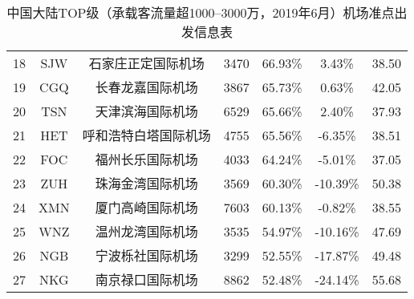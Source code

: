 \begin{table}
{\begin{tabular}{ccccccc}
            18 & SJW & 石家庄正定国际机场 & 3470 & 66.93\% & 3.43\% & 38.50 \\
            \rowcolor[HTML]{EFEFEF}
            19 & CGQ & 长春龙嘉国际机场 & 3867 & 65.73\% & 0.63\% & 42.05 \\
            20 & TSN & 天津滨海国际机场 & 6529 & 65.66\% & 2.40\% & 37.93 \\
            \rowcolor[HTML]{EFEFEF}
            21 & HET & 呼和浩特白塔国际机场 & 4755 & 65.56\% & -6.35\% & 38.51 \\
            22 & FOC & 福州长乐国际机场 & 4033 & 64.24\% & -5.01\% & 37.05 \\
            \rowcolor[HTML]{EFEFEF}
            23 & ZUH & 珠海金湾国际机场 & 3569 & 60.30\% & -10.39\% & 50.38 \\
            24 & XMN & 厦门高崎国际机场 & 7603 & 60.13\% & -0.82\% & 38.55 \\
            \rowcolor[HTML]{EFEFEF}
            25 & WNZ & 温州龙湾国际机场 & 3535 & 54.97\% & -10.16\% & 47.69 \\
            26 & NGB & 宁波栎社国际机场 & 3299 & 52.55\% & -17.87\% & 49.48 \\
            \rowcolor[HTML]{EFEFEF}
            27 & NKG & 南京禄口国际机场 & 8862 & 52.48\% & -24.14\% & 55.68 \\ \hline
        \end{tabular}%
    }
    \caption{中国大陆TOP级（承载客流量超1000--3000万，2019年6月）机场准点出发信息表}\label{T:depart_3_2}
\end{table}

